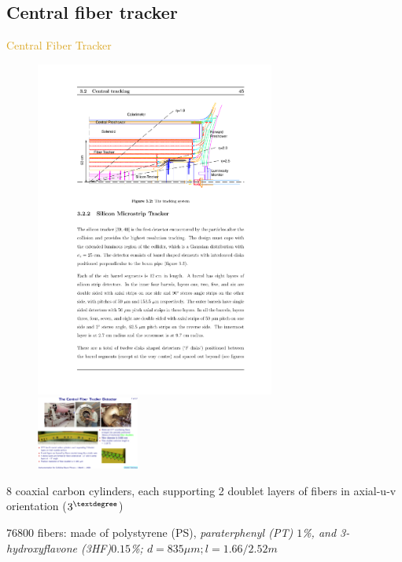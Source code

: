 \subsection{Central fiber tracker}
\begin{frame}{\textcolor{Goldenrod}{Central Fiber Tracker}}
  \begin{overlayarea}{\textwidth}{\textheight}
    \begin{figure}[h]\centering
      \includegraphics[height=0.4\textheight,width=0.7\textwidth]{./Images/08_CT_01.pdf}
      \includegraphics[height=0.2\textheight, width=0.3\textwidth]{./Images/15_CFT}
    \end{figure}
    \itt
    
    
  \item 8 coaxial carbon cylinders, each supporting 2 doublet layers
    of fibers in axial-u-v orientation ($3^{\textdegree}$)
  \item $76800$ fibers: made of polystyrene (PS), \it{paraterphenyl (PT) $1$\%, and
      3-hydroxyflavone (3HF)$0.15$\%}; $d = 835 \mu m ; l = 1.66/2.52 m$
    \tti
  \end{overlayarea}
\end{frame}

